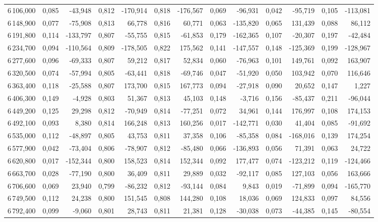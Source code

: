 \begin{longtable}{rrrrrrrrrrrrr}
6\,106,000 & 0,085 & -43,948 & 0,812 & -170,914 & 0,818 & -176,567 & 0,069 & -96,931 & 0,042 & -95,719 & 0,105 & -113,081\\
6\,148,900 & 0,077 & -75,908 & 0,813 & 66,778 & 0,816 & 60,771 & 0,063 & -135,820 & 0,065 & 131,439 & 0,088 & 86,112\\
6\,191,800 & 0,114 & -133,797 & 0,807 & -55,755 & 0,815 & -61,853 & 0,179 & -162,365 & 0,107 & -20,307 & 0,197 & -42,484\\
6\,234,700 & 0,094 & -110,564 & 0,809 & -178,505 & 0,822 & 175,562 & 0,141 & -147,557 & 0,148 & -125,369 & 0,199 & -128,967\\
6\,277,600 & 0,096 & -69,333 & 0,807 & 59,212 & 0,817 & 52,834 & 0,060 & -76,963 & 0,101 & 149,761 & 0,092 & 163,907\\
6\,320,500 & 0,074 & -57,994 & 0,805 & -63,441 & 0,818 & -69,746 & 0,047 & -51,920 & 0,050 & 103,942 & 0,070 & 116,646\\
6\,363,400 & 0,118 & -25,588 & 0,807 & 173,700 & 0,815 & 167,773 & 0,094 & -27,918 & 0,090 & 20,652 & 0,147 & 1,227\\
6\,406,300 & 0,149 & -4,928 & 0,803 & 51,367 & 0,813 & 45,103 & 0,148 & -3,716 & 0,156 & -85,437 & 0,211 & -96,044\\
6\,449,200 & 0,125 & 29,298 & 0,812 & -70,949 & 0,814 & -77,251 & 0,072 & 34,961 & 0,144 & 176,997 & 0,108 & 174,153\\
6\,492,100 & 0,093 & 8,380 & 0,814 & 166,248 & 0,813 & 160,256 & 0,017 & -142,771 & 0,030 & 41,404 & 0,085 & -91,692\\
6\,535,000 & 0,112 & -48,897 & 0,805 & 43,753 & 0,811 & 37,358 & 0,106 & -85,358 & 0,084 & -168,016 & 0,139 & 174,254\\
6\,577,900 & 0,042 & -73,404 & 0,806 & -78,907 & 0,812 & -85,480 & 0,066 & -136,893 & 0,056 & 71,391 & 0,063 & 24,722\\
6\,620,800 & 0,017 & -152,344 & 0,800 & 158,523 & 0,814 & 152,344 & 0,092 & 177,477 & 0,074 & -123,212 & 0,119 & -124,466\\
6\,663,700 & 0,028 & -77,190 & 0,800 & 36,409 & 0,811 & 29,889 & 0,032 & -92,117 & 0,085 & 127,103 & 0,056 & 163,666\\
6\,706,600 & 0,069 & 23,940 & 0,799 & -86,232 & 0,812 & -93,144 & 0,084 & 9,843 & 0,019 & -71,899 & 0,094 & -165,770\\
6\,749,500 & 0,112 & 24,238 & 0,800 & 151,545 & 0,808 & 144,280 & 0,108 & 18,036 & 0,069 & 124,833 & 0,097 & 84,556\\
6\,792,400 & 0,099 & -9,060 & 0,801 & 28,743 & 0,811 & 21,381 & 0,128 & -30,038 & 0,073 & -44,385 & 0,145 & -80,554\\

\end{longtable}
